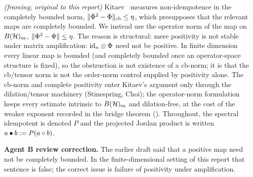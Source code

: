\begin{remark}\label{rem:cb-norm}
 \emph{(framing; original to this report)}
Kitaev~\cite{Kitaev2024} measures non-idempotence in the completely bounded
norm, $\lVert \Phi^2-\Phi \rVert_{\mathrm{cb}}\le\eta$, which presupposes that the
relevant maps are completely bounded. We instead use the operator norm of the
map on $B(\mathcal{H})_{\mathrm{sa}}$, $\lVert \Phi^2-\Phi \rVert\le\eta$. The reason is structural:
mere positivity is not stable under matrix amplification:
$\mathrm{id}_n\otimes\Phi$ need not be positive. In finite dimension every
linear map is bounded (and completely bounded once an operator-space structure
is fixed), so the obstruction is not existence of a cb-norm; it is that the
cb/tensor norm is not the order-norm control supplied by positivity alone.
The cb-norm and complete positivity enter Kitaev's argument only through the
dilation/tensor machinery (Stinespring, Choi); the operator-norm formulation
keeps every estimate intrinsic to $B(\mathcal{H})_{\mathrm{sa}}$ and dilation-free, at the cost of the
weaker exponent recorded in the bridge theorem (). Throughout,
the spectral idempotent is denoted $P$ and the projected Jordan product is
written $a\bullet b:=P(a\circ b)$.

\smallskip\noindent\textbf{Agent B review correction.}
The earlier draft said that a positive map need not be completely bounded. In
the finite-dimensional setting of this report that sentence is false; the
correct issue is failure of positivity under amplification.
\end{remark}
